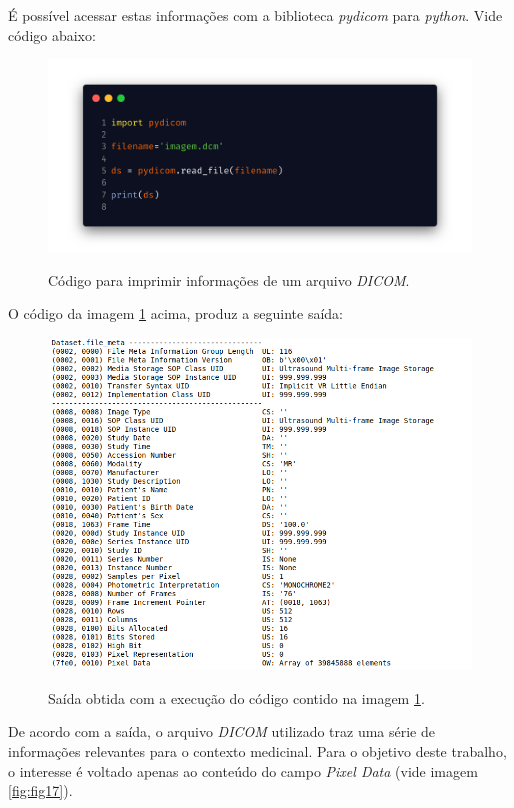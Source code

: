 É possível acessar estas informações com a biblioteca \textit{pydicom} \cite{pydicom_pydicom_2022} para \textit{python}. Vide código abaixo:

\begin{figure}[H]
    \centering
    \caption{Código para imprimir informações de um arquivo \textit{DICOM}.}
    \includegraphics[width=14cm]{fig/code_1.png}
    \label{fig:fig16}
\end{figure}

O código da imagem \ref{fig:fig16} acima, produz a seguinte saída:

\begin{figure}[H]
    \centering
    \caption{Saída obtida com a execução do código contido na imagem \ref{fig:fig16}.}
    \includegraphics[width=12cm]{fig/output_1.png}
    \label{fig:saida:fig16}
\end{figure}

De acordo com a saída, o arquivo \textit{DICOM} utilizado traz uma série de informações relevantes para o contexto medicinal. Para o objetivo deste trabalho, o interesse é voltado apenas ao conteúdo do campo \textit{Pixel Data} (vide imagem \ref{fig:fig17}).

